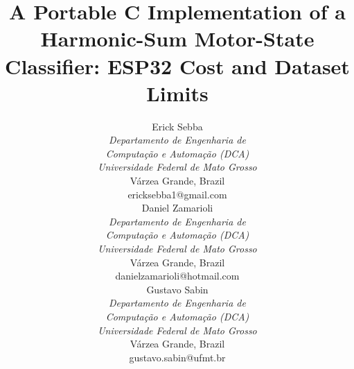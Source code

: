 \documentclass[conference]{IEEEtran}
\newif\ifwip
\begin{document}
\title{A Portable C Implementation of a Harmonic-Sum Motor-State Classifier: ESP32 Cost and
Dataset Limits\ifwip\ (Work in Progress)\fi}

\author{
\begin{minipage}[t]{0.31\textwidth}
\centering
Erick Sebba\\
\small
\textit{Departamento de Engenharia de}\\
\textit{Computa\c{c}\~ao e Automa\c{c}\~ao (DCA)}\\
\textit{Universidade Federal de Mato Grosso}\\
V\'arzea Grande, Brazil\\
ericksebba1@gmail.com
\end{minipage}\hfill
\begin{minipage}[t]{0.31\textwidth}
\centering
Daniel Zamarioli\\
\small
\textit{Departamento de Engenharia de}\\
\textit{Computa\c{c}\~ao e Automa\c{c}\~ao (DCA)}\\
\textit{Universidade Federal de Mato Grosso}\\
V\'arzea Grande, Brazil\\
danielzamarioli@hotmail.com
\end{minipage}\hfill
\begin{minipage}[t]{0.31\textwidth}
\centering
Gustavo Sabin\\
\small
\textit{Departamento de Engenharia de}\\
\textit{Computa\c{c}\~ao e Automa\c{c}\~ao (DCA)}\\
\textit{Universidade Federal de Mato Grosso}\\
V\'arzea Grande, Brazil\\
gustavo.sabin@ufmt.br
\end{minipage}
}

\maketitle
\end{document}
